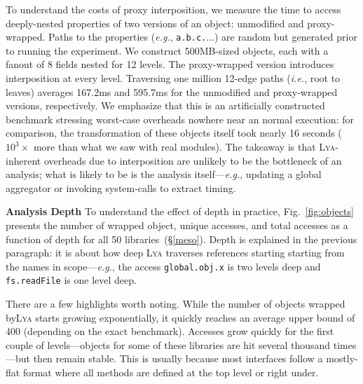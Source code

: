 \documentclass[letterpaper,twocolumn,10pt]{article}
\def\eg{{\em e.g.}, }
\def\ie{{\em i.e.}, }
\newcommand{\heading}[1]{\vspace{2pt}\noindent\textbf{#1}\enspace}
\newcommand{\ttt}[1]{\texttt{#1}}
\newcommand{\sx}[1]{(\S\ref{#1})}
\newcommand{\sys}{{\scshape Lya}\xspace}
\begin{document}
To understand the costs of proxy interposition, we measure the time to access deeply-nested properties of two versions of an object:
  unmodified and proxy-wrapped.
Paths to the properties (\eg \ttt{a.b.c.$\ldots$}) are random but generated prior to running the experiment.
We construct 500MB-sized objects, each with a fanout of 8 fields nested for 12 levels.
The proxy-wrapped version introduces interposition at every level.
Traversing one million 12-edge paths (\ie root to leaves) averages 167.2ms and 595.7ms for the unmodified and proxy-wrapped versions, respectively.
% 
We emphasize that this is an artificially constructed benchmark stressing worst-case overheads nowhere near an normal execution:
  for comparison, the transformation of these objects itself took nearly 16 seconds ($10^3\times$ more than what we saw with real modules).
The takeaway is that \sys-inherent overheads due to interposition are unlikely to be the bottleneck of an analysis;
  what is likely to be is the analysis itself---\eg updating a global aggregator or invoking system-calls to extract timing.

\heading{Analysis Depth}
To understand the effect of depth in practice, Fig.~\ref{fig:objects} presents the number of wrapped object, unique accesses, and total accesses as a function of depth for all 50 libraries~\sx{meso}.
Depth is explained in the previous paragraph:
   it is about how deep \sys traverses references starting starting from the names in scope---\eg the access \ttt{global.obj.x} is two levels deep and \ttt{fs.readFile} is one level deep.

There are a few highlights worth noting.
While the number of objects wrapped by\sys starts growing exponentially, it quickly reaches an average upper bound of 400 (depending on the exact benchmark).
Accesses grow quickly for the first couple of levels---objects for some of these libraries are hit several thousand times---but then remain stable.
This is usually because most interfaces follow a mostly-flat format where all methods are defined at the top level or right under.
\end{document}
